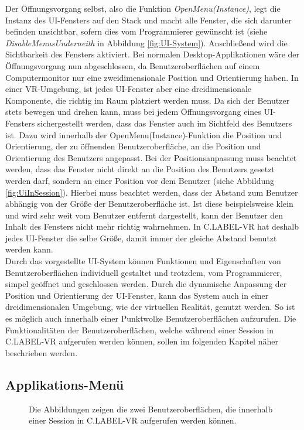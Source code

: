 Der Öffnungsvorgang selbst, also die Funktion \textit{OpenMenu(Instance)}, legt die Instanz des UI-Fensters auf den Stack und macht alle Fenster, die sich darunter befinden unsichtbar, sofern dies vom Programmierer gewünscht ist (siehe \textit{DisableMenusUnderneith} in Abbildung \ref{fig:UI-System}). Anschließend wird die Sichtbarkeit des Fensters aktiviert. Bei normalen Desktop-Applikationen wäre der Öffnungsvorgang nun abgeschlossen, da Benutzeroberflächen auf einem Computermonitor nur eine zweidimensionale Position und Orientierung haben. In einer VR-Umgebung, ist jedes UI-Fenster aber eine dreidimensionale Komponente, die richtig im Raum platziert werden muss. Da sich der Benutzer stets bewegen und drehen kann, muss bei jedem Öffnungsvorgang eines UI-Fensters sichergestellt werden, dass das Fenster auch im Sichtfeld des Benutzers ist. Dazu wird innerhalb der OpenMenu(Instance)-Funktion die Position und Orientierung, der zu öffnenden Benutzeroberfläche, an die Position und Orientierung des Benutzers angepasst. Bei der Positionsanpassung muss beachtet werden, dass das Fenster nicht direkt an die Position des Benutzers gesetzt werden darf, sondern an einer Position vor dem Benutzer (siehe Abbildung \ref{fig:UiInSession}). Hierbei muss beachtet werden, dass der Abstand zum Benutzer abhängig von der Größe der Benutzeroberfläche ist. Ist diese beispielsweise klein und wird sehr weit vom Benutzer entfernt dargestellt, kann der Benutzer den Inhalt des Fensters nicht mehr richtig wahrnehmen. In C.LABEL-VR hat deshalb jedes UI-Fenster die selbe Größe, damit immer der gleiche Abstand benutzt werden kann.\\

Durch das vorgestellte UI-System können Funktionen und Eigenschaften von Benutzeroberflächen individuell gestaltet und trotzdem, vom Programmierer, simpel geöffnet und geschlossen werden. Durch die dynamische Anpassung der Position und Orientierung der UI-Fenster, kann das System auch in einer dreidimensionalen Umgebung, wie der virtuellen Realität, genutzt werden. So ist es möglich auch innerhalb einer Punktwolke Benutzeroberflächen aufzurufen. Die Funktionalitäten der Benutzeroberflächen, welche während einer Session in C.LABEL-VR aufgerufen werden können, sollen im folgenden Kapitel näher beschrieben werden.
  
\subsection{Applikations-Menü}
\label{sec:AppMenu}
\begin{figure}
    \centering
    \qquad
    \caption{Die Abbildungen zeigen die zwei Benutzeroberflächen, die innerhalb einer Session in C.LABEL-VR aufgerufen werden können.}\label{fig:ApplicationMenu}%
\end{figure}

